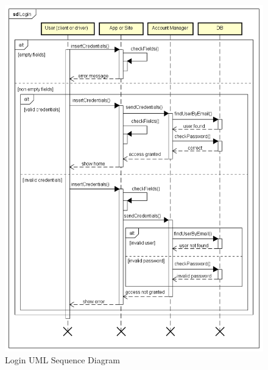 \documentclass[a4paper]{article}
\begin{document}
\begin{figure}[H]
\includegraphics[width=\sequenceWidth]{Sequence-Login}
\centering
\caption{Login UML Sequence Diagram}
\label{fig:sequencelogin}
\end{figure}
\end{document}
